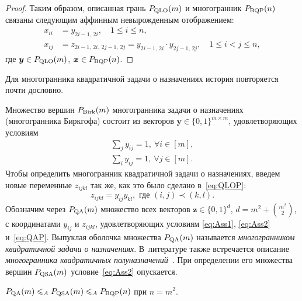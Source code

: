 \begin{proof}
	Таким образом, описанная грань $P_{\textup{QLO}}(m)$ и многогранник $P_{\textup{BQP}}(n)$ связаны следующим аффинным невырожденным отображением:
	$$
	\begin{aligned}
	x_{ii} &= y_{2i-1,\, 2i}, \quad 1\le i\le n,\\
	x_{ij} &= z_{2i-1,\, 2i,\, 2j-1,\, 2j} = y_{2i-1,\, 2i} \cdot y_{2j-1,\, 2j}, \quad 1\le i < j\le n,
	\end{aligned}
	$$
	где $\bm{y} \in P_{\textup{QLO}}(m)$, $\bm{x} \in P_{\textup{BQP}}(n)$.
\end{proof}

Для многогранника квадратичной задачи о назначениях история повторяется почти дословно.

Множество вершин $P_{\textup{Birk}}(m)$ многогранника задачи о назначениях (многогранника Биркгофа)
состоит из векторов $\bm{y}\in\{0,1\}^{m\times m}$, удовлетворяющих условиям
\begin{align}
\sum_j y_{ij} = 1, \ \forall i \in [m], \label{eq:Ass1}\\ 
\sum_i y_{ij} = 1, \ \forall j \in [m]. \label{eq:Ass2}
\end{align}
Чтобы определить многогранник квадратичной задачи о назначениях,
введем новые переменные $z_{ijkl}$ так же, как это было сделано в~\eqref{eq:QLOP}:
\begin{equation}
\label{eq:QAP}
z_{ijkl} = y_{ij} y_{kl}, \text{ где } (i,j) \prec (k,l).
\end{equation}
Обозначим через $P_{\textup{QA}}(m)$ множество всех векторов $\bm{z}\in\{0,1\}^d$, $d = m^2 + \binom{m^2}{2}$,
с координатами $y_{ij}$ и $z_{ijkl}$, удовлетворяющих условиям \eqref{eq:Ass1}, \eqref{eq:Ass2} и~\eqref{eq:QAP}.
Выпуклая оболочка множества $P_{\textup{QA}}(m)$ называется \emph{многогранником квадратичной задачи о назначениях}.
В~литературе также встречается описание \emph{многогранника квадратичных полуназначений}~\cite{Saito:2009}.
При определении его множества вершин $P_{\textup{QSA}}(m)$ условие~\eqref{eq:Ass2} опускается.

\begin{theorem} 
	\label{thm:QAP2BQP}
	$P_{\textup{QA}}(m) \leqslant_A P_{\textup{QSA}}(m) \leqslant_A P_{\textup{BQP}}(n)$ при $n = m^2$.
\end{theorem} 

